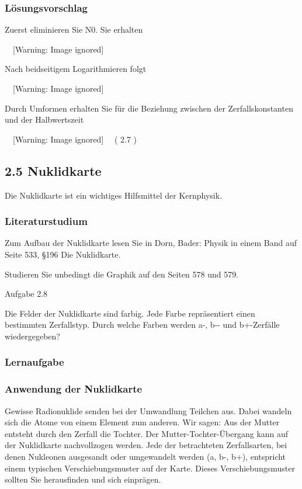 \documentclass[12pt,a4paper,twoside]{article}
\begin{document}
\subsubsection*{Lösungsvorschlag}
Zuerst eliminieren Sie N0. Sie erhalten

\ \   [Warning: Image ignored] %
 

Nach beidseitigem Logarithmieren folgt

\ \   [Warning: Image ignored] %
 

Durch Umformen erhalten Sie für die Beziehung zwischen der Zerfallskonstanten und der Halbwertszeit

\ \   [Warning: Image ignored] %
 \ \ ( 2.7 )

\subsection[2.5 Nuklidkarte]{2.5 Nuklidkarte}

\bigskip

Die Nuklidkarte ist ein wichtiges Hilfsmittel der Kernphysik.

\subsubsection*{Literaturstudium}
Zum Aufbau der Nuklidkarte lesen Sie in Dorn, Bader: {\quotedblbase}Physik in einem Band{\quotedblbase} auf Seite 533, {\quotedblbase}§196 Die Nuklidkarte{\quotedblbase}.

Studieren Sie unbedingt die Graphik auf den Seiten 578 und 579.

Aufgabe 2.8

Die Felder der Nuklidkarte sind farbig. Jede Farbe repräsentiert einen bestimmten Zerfallstyp. Durch welche Farben werden a\nobreakdash-, b\nobreakdash-\nobreakdash- und b+\nobreakdash-Zerfälle wiedergegeben?


\bigskip

\subsubsection*{Lernaufgabe}
\subsubsection*{Anwendung der Nuklidkarte}
Gewisse Radionuklide senden bei der Umwandlung Teilchen aus. Dabei wandeln sich die Atome von einem Element zum anderen. Wir sagen: Aus der Mutter entsteht durch den Zerfall die Tochter. Der Mutter-Tochter-Übergang kann auf der Nuklidkarte nachvollzogen werden. Jede der betrachteten Zerfallsarten, bei denen Nukleonen ausgesandt oder umgewandelt werden (\textgreek{a}, \textgreek{b}\nobreakdash-, \textgreek{b}+), entspricht einem typischen Verschiebungsmuster auf der Karte. Dieses Verschiebungsmuster sollten Sie herausfinden und sich einprägen.
\end{document}
